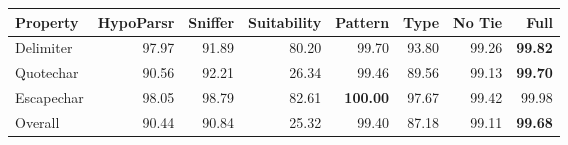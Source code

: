 \begin{tabular}{lrrr|rrrr}
Property & HypoParsr & Sniffer & Suitability & Pattern & Type & No Tie & Full\\
\hline
Delimiter & 97.97 & 91.89 & 80.20 & 99.70 & 93.80 & 99.26 & \textbf{99.82}\\
Quotechar & 90.56 & 92.21 & 26.34 & 99.46 & 89.56 & 99.13 & \textbf{99.70}\\
Escapechar & 98.05 & 98.79 & 82.61 & \textbf{100.00} & 97.67 & 99.42 & 99.98\\
Overall & 90.44 & 90.84 & 25.32 & 99.40 & 87.18 & 99.11 & \textbf{99.68}\\
\hline
\end{tabular}